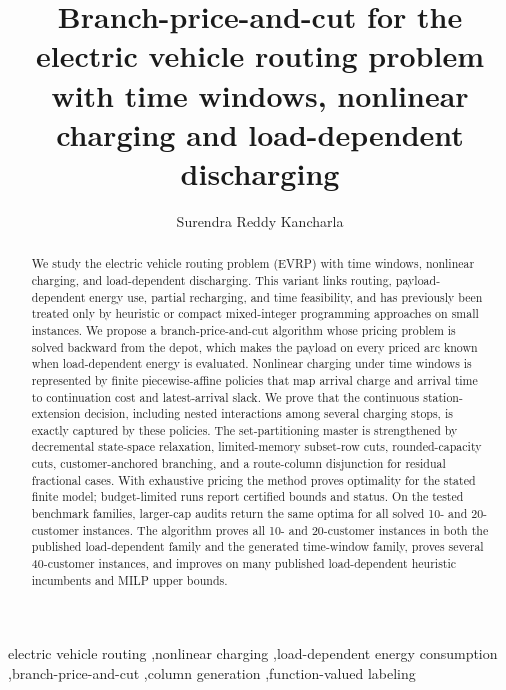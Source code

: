 \documentclass[review,3p,authoryear]{elsarticle}
\def\corref#1{}%
\theoremstyle{plain}
\theoremstyle{definition}
\theoremstyle{remark}
\begin{document}
\begin{frontmatter}

\title{Branch-price-and-cut for the electric vehicle routing problem
with time windows, nonlinear charging and load-dependent discharging}

\author[tud]{Surendra Reddy Kancharla\corref{cor1}}

\address[tud]{``Friedrich List'' Faculty of Transport and Traffic Sciences, Technische Universit\"at Dresden, Dresden, Germany}

\begin{abstract}
We study the electric vehicle routing problem (EVRP) with time windows, nonlinear
charging, and load-dependent discharging. This variant links routing,
payload-dependent energy use, partial recharging, and time feasibility, and has
previously been treated only by heuristic or compact mixed-integer programming
approaches on small instances. We propose a branch-price-and-cut algorithm whose
pricing problem is solved backward from the depot,
which makes the payload on every priced arc known when load-dependent energy is
evaluated. Nonlinear charging under time windows is represented by finite
piecewise-affine policies that map arrival charge and arrival time to continuation
cost and latest-arrival slack. We prove that the continuous station-extension
decision, including nested interactions among several charging stops, is exactly
captured by these policies. The set-partitioning master is strengthened by
decremental state-space relaxation, limited-memory subset-row cuts,
rounded-capacity cuts, customer-anchored branching, and a route-column disjunction
for residual fractional cases.
With exhaustive pricing the method proves optimality for the stated finite model;
budget-limited runs report certified bounds and status. On the tested benchmark
families, larger-cap audits return the same optima for all solved 10- and
20-customer instances. The algorithm proves all 10- and
20-customer instances in both the published load-dependent family and the generated
time-window family, proves several 40-customer instances, and improves on many
published load-dependent heuristic incumbents and MILP upper bounds.
\end{abstract}

\begin{keyword}
electric vehicle routing \sep nonlinear charging \sep load-dependent energy
consumption \sep branch-price-and-cut \sep column generation \sep function-valued
labeling
\end{keyword}

\end{frontmatter}
\end{document}
